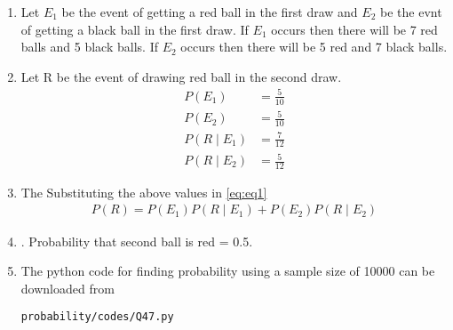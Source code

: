 \renewcommand{\theequation}{\theenumi}
\begin{enumerate}[label=\thesection.\arabic*.,ref=\thesection.\theenumi]
\item Let $E_1$ be the event of getting a red ball in the first draw and $E_2$ be the evnt of getting a black ball in the first draw. If $E_1$ occurs then there will be 7 red balls and 5 black balls. If $E_2$ occurs then there will be 5 red and 7 black balls.
\item Let R be the event of drawing red ball in the second draw.
\begin{align}
P(E_1) &= \frac{5}{10} \\
P(E_2) &= \frac{5}{10} \\
P(R \mid E_1) &= \frac{7}{12} \\
P(R \mid E_2) &= \frac{5}{12}
\end{align}
\item The Substituting the above values in \eqref{eq:eq1}
\begin{align}
P(R)= P(E_1)P(R \mid E_1) + P(E_2)P(R \mid E_2)
\label{eq:eq1}
\end{align}
\item. Probability that second ball is red = 0.5.
\item The python code for finding probability using a sample size of 10000 can be downloaded from
\begin{lstlisting}
probability/codes/Q47.py
\end{lstlisting}

\end{enumerate}